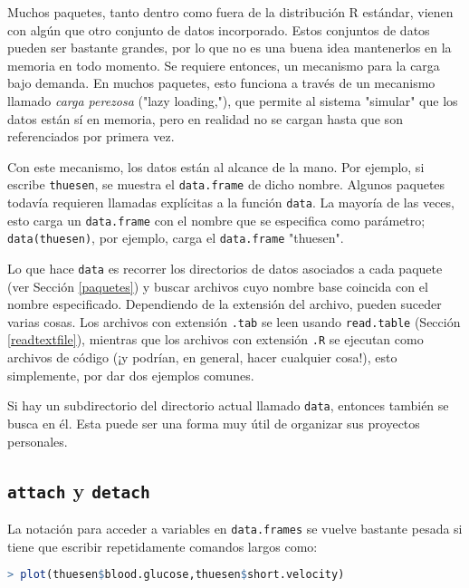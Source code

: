 Muchos paquetes, tanto dentro como fuera de la distribución R estándar, vienen
con algún que otro conjunto de datos incorporado. Estos conjuntos de datos
pueden ser bastante grandes, por lo que no es una buena idea mantenerlos en la
memoria en todo momento. Se requiere entonces, un mecanismo para la carga bajo
demanda. En muchos paquetes, esto funciona a través de un mecanismo llamado
\textit{carga perezosa} ("lazy loading,"), que permite al sistema "simular" que
los datos están sí  en memoria, pero en realidad no se cargan hasta que son
referenciados por primera vez.  

Con este mecanismo, los datos están al alcance de la mano. Por ejemplo, si
escribe \texttt{thuesen}, se muestra el \texttt{data.frame} de dicho nombre.
Algunos paquetes todavía requieren llamadas explícitas a la función
\texttt{data}.  La mayoría de las veces, esto carga un \texttt{data.frame} con
el nombre que se especifica como parámetro; \texttt{data(thuesen)}, por
ejemplo, carga el \texttt{data.frame} "thuesen".

Lo que hace \texttt{data} es recorrer los directorios de datos asociados a cada
paquete (ver Sección \ref{paquetes}) y buscar archivos cuyo nombre base
coincida con el nombre especificado. Dependiendo de la extensión del archivo,
pueden suceder varias cosas. Los archivos con extensión \texttt{.tab} se leen
usando \texttt{read.table} (Sección \ref{readtextfile}), mientras que los
archivos con extensión \texttt{.R} se ejecutan como archivos de código (¡y
podrían, en general, hacer cualquier cosa!), esto simplemente, por dar dos
ejemplos comunes.

Si hay un subdirectorio del directorio actual llamado \texttt{data}, entonces
también se busca en él. Esta puede ser una forma muy útil de organizar sus
proyectos personales.

\subsection{\texttt{attach} y \texttt{detach}}\label{attachdetach}

La notación para acceder a variables en \texttt{data.frames} se vuelve bastante pesada
si tiene que escribir repetidamente comandos largos como:

\begin{lstlisting}[language=R]
> plot(thuesen$blood.glucose,thuesen$short.velocity)
\end{lstlisting}

